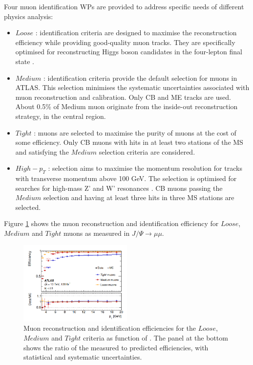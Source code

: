 Four muon identification WPs are provided to address specific needs of different physics analysis:
\begin{itemize}
    \item $Loose$ : identification criteria are designed to maximise the reconstruction efficiency while providing good-quality muon tracks. They are specifically optimised for reconstructing Higgs boson candidates in the four-lepton final state \cite{Higgs_4leptons}.
    \item $Medium$ : identification criteria provide the default selection for muons in ATLAS. This selection minimises the systematic uncertainties associated with muon reconstruction and calibration. Only CB and ME tracks are used. About 0.5\% of Medium muon originate from the inside-out reconstruction strategy, in the central region. 
    \item $Tight$ : muons are selected to maximise the purity of muons at the cost of some efficiency. Only CB muons with hits in at least two stations of the MS and satisfying the $Medium$ selection criteria are considered.
    \item $High-p_T$ : selection  aims  to  maximise the momentum resolution  for  tracks  with transverse momentum above  100 GeV. The  selection is optimised  for  searches  for  high-mass Z' and W' resonances \cite{W,dilepton}. CB muons passing the $Medium$ selection  and having at least three hits in three MS stations are selected.
\end{itemize}
Figure \ref{fig:chap2:Objects:Muon:ID:Eff} shows the muon reconstruction and identification efficiency for $Loose$, $Medium$ and $Tight$ muons as measured in $J/\Psi\rightarrow\mu\mu$. 
\begin{figure}[htbp]
    \centering
    \includegraphics[width=0.5\textwidth]{Ch2/Img/Muon_ID_Eff.png}
    \caption{Muon reconstruction and identification efficiencies for the $Loose$, $Medium$ and $Tight$ criteria as function of \pT. The panel at the bottom shows the ratio of the measured to predicted efficiencies, with statistical and systematic uncertainties.}
    \label{fig:chap2:Objects:Muon:ID:Eff}
\end{figure}

